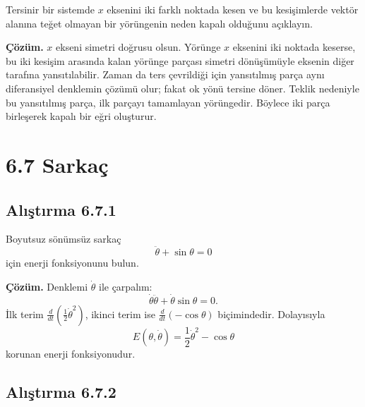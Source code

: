 \begin{justify}
Tersinir bir sistemde $x$ eksenini iki farklı noktada kesen ve bu kesişimlerde vektör alanına teğet olmayan bir yörüngenin neden kapalı olduğunu açıklayın.

\textbf{Çözüm.} $x$ ekseni simetri doğrusu olsun. Yörünge $x$ eksenini iki noktada keserse, bu iki kesişim arasında kalan yörünge parçası simetri dönüşümüyle eksenin diğer tarafına yansıtılabilir. Zaman da ters çevrildiği için yansıtılmış parça aynı diferansiyel denklemin çözümü olur; fakat ok yönü tersine döner. Teklik nedeniyle bu yansıtılmış parça, ilk parçayı tamamlayan yörüngedir. Böylece iki parça birleşerek kapalı bir eğri oluşturur.
\end{justify}

\section*{6.7 Sarkaç}

\subsection*{Alıştırma 6.7.1}

\begin{justify}
Boyutsuz sönümsüz sarkaç
\begin{equation}
\ddot{\theta}+\sin\theta=0
\end{equation}
için enerji fonksiyonunu bulun.

\textbf{Çözüm.} Denklemi $\dot{\theta}$ ile çarpalım:
\begin{equation}
\dot{\theta}\ddot{\theta}+\dot{\theta}\sin\theta=0.
\end{equation}
İlk terim $\frac{d}{dt}(\frac{1}{2}\dot{\theta}^{2})$, ikinci terim ise $\frac{d}{dt}(-\cos\theta)$ biçimindedir. Dolayısıyla
\begin{equation}
E(\theta,\dot{\theta})=\frac{1}{2}\dot{\theta}^{2}-\cos\theta
\end{equation}
korunan enerji fonksiyonudur.
\end{justify}

\subsection*{Alıştırma 6.7.2}

